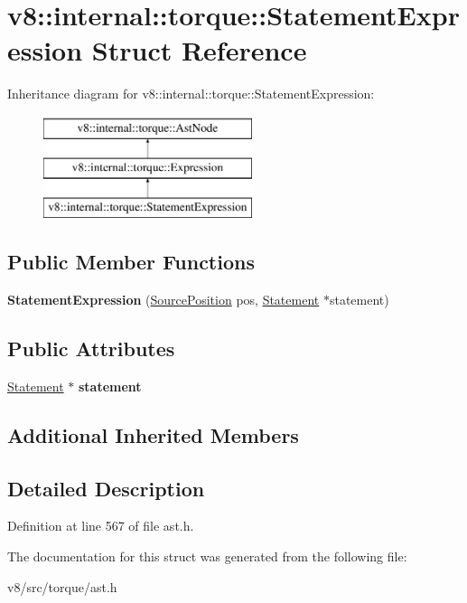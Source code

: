 \hypertarget{structv8_1_1internal_1_1torque_1_1StatementExpression}{}\section{v8\+:\+:internal\+:\+:torque\+:\+:Statement\+Expression Struct Reference}
\label{structv8_1_1internal_1_1torque_1_1StatementExpression}
Inheritance diagram for v8\+:\+:internal\+:\+:torque\+:\+:Statement\+Expression\+:\begin{figure}[H]
\begin{center}
\leavevmode
\includegraphics[height=3.000000cm]{structv8_1_1internal_1_1torque_1_1StatementExpression}
\end{center}
\end{figure}
\subsection*{Public Member Functions}
\begin{DoxyCompactItemize}
\item 
\mbox{\label{structv8_1_1internal_1_1torque_1_1StatementExpression_a1fe4c653dc4d664a78ba436d5c0d155d}} 
{\bfseries Statement\+Expression} (\mbox{\hyperlink{structv8_1_1internal_1_1torque_1_1SourcePosition}{Source\+Position}} pos, \mbox{\hyperlink{structv8_1_1internal_1_1torque_1_1Statement}{Statement}} $\ast$statement)
\end{DoxyCompactItemize}
\subsection*{Public Attributes}
\begin{DoxyCompactItemize}
\item 
\mbox{\label{structv8_1_1internal_1_1torque_1_1StatementExpression_a0d70ef82b4d27ee05f6df9ccb8c51ad0}} 
\mbox{\hyperlink{structv8_1_1internal_1_1torque_1_1Statement}{Statement}} $\ast$ {\bfseries statement}
\end{DoxyCompactItemize}
\subsection*{Additional Inherited Members}


\subsection{Detailed Description}


Definition at line 567 of file ast.\+h.



The documentation for this struct was generated from the following file\+:\begin{DoxyCompactItemize}
\item 
v8/src/torque/ast.\+h\end{DoxyCompactItemize}
